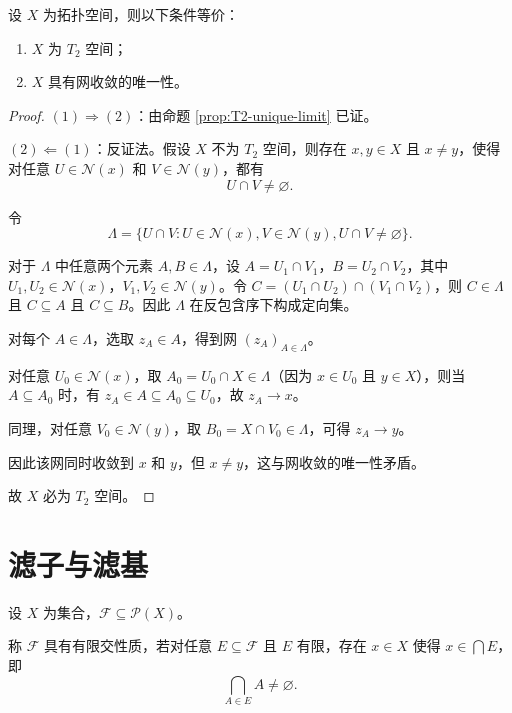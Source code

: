 \documentclass[lang=cn,a4paper,newtx,figureplace=section,tableplace=section]{elegantbook}
\begin{document}
\begin{proposition}\label{prop:T2-diagonal}
设 $X$ 为拓扑空间，则以下条件等价：
\begin{enumerate}
    \item $X$ 为 $T_2$ 空间；
    \item $X$ 具有网收敛的唯一性。
\end{enumerate}
\end{proposition}
\begin{proof}
$(1) \Rightarrow (2)$：由命题 \ref{prop:T2-unique-limit} 已证。

$(2) \Leftarrow (1)$：反证法。假设 $X$ 不为 $T_2$ 空间，则存在 $x, y \in X$ 且 $x \neq y$，使得对任意 $U \in \mathcal{N}(x)$ 和 $V \in \mathcal{N}(y)$，都有
\begin{equation}
U \cap V \neq \varnothing.
\end{equation}

令
\begin{equation}
\Lambda = \{U \cap V : U \in \mathcal{N}(x), V \in \mathcal{N}(y), U \cap V \neq \varnothing\}.
\end{equation}

对于 $\Lambda$ 中任意两个元素 $A, B \in \Lambda$，设 $A = U_1 \cap V_1$，$B = U_2 \cap V_2$，其中 $U_1, U_2 \in \mathcal{N}(x)$，$V_1, V_2 \in \mathcal{N}(y)$。令 $C = (U_1 \cap U_2) \cap (V_1 \cap V_2)$，则 $C \in \Lambda$ 且 $C \subseteq A$ 且 $C \subseteq B$。因此 $\Lambda$ 在反包含序下构成定向集。

对每个 $A \in \Lambda$，选取 $z_A \in A$，得到网 $(z_A)_{A \in \Lambda}$。

对任意 $U_0 \in \mathcal{N}(x)$，取 $A_0 = U_0 \cap X \in \Lambda$（因为 $x \in U_0$ 且 $y \in X$），则当 $A \subseteq A_0$ 时，有 $z_A \in A \subseteq A_0 \subseteq U_0$，故 $z_A \to x$。

同理，对任意 $V_0 \in \mathcal{N}(y)$，取 $B_0 = X \cap V_0 \in \Lambda$，可得 $z_A \to y$。

因此该网同时收敛到 $x$ 和 $y$，但 $x \neq y$，这与网收敛的唯一性矛盾。

故 $X$ 必为 $T_2$ 空间。
\end{proof}

\section{滤子与滤基}

\begin{definition}[有限交性质]\label{def:finite-intersection}
设 $X$ 为集合，$\mathcal{F} \subseteq \mathcal{P}(X)$。

称 $\mathcal{F}$ 具有有限交性质，若对任意 $E \subseteq \mathcal{F}$ 且 $E$ 有限，存在 $x \in X$ 使得 $x \in \bigcap E$，即
\begin{equation}
\bigcap_{A \in E} A \neq \varnothing.
\end{equation}
\end{definition}
\end{document}
